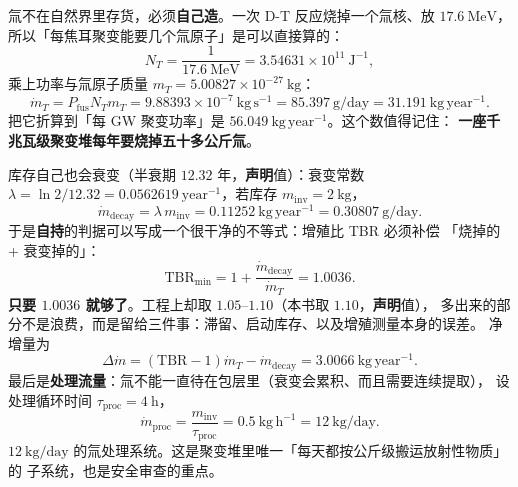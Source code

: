 氚不在自然界里存货，必须\textbf{自己造}。一次 D-T 反应烧掉一个氚核、放
$17.6\ \mathrm{MeV}$，所以「每焦耳聚变能要几个氚原子」是可以直接算的：
\begin{equation}
N_T = \frac{1}{17.6\ \mathrm{MeV}} = 3.54631\times10^{11}\ \mathrm{J^{-1}},
\label{eq:app-z-burnj}
\end{equation}
乘上功率与氚原子质量 $m_T=5.00827\times10^{-27}\ \mathrm{kg}$：
\begin{equation}
\dot m_T = P_{\mathrm{fus}}N_T m_T
= 9.88393\times10^{-7}\ \mathrm{kg\,s^{-1}}
= 85.397\ \mathrm{g/day} = 31.191\ \mathrm{kg\,year^{-1}}.
\label{eq:app-z-burnrate}
\end{equation}
把它折算到「每 GW 聚变功率」是 $56.049\ \mathrm{kg\,year^{-1}}$。这个数值得记住：
\textbf{一座千兆瓦级聚变堆每年要烧掉五十多公斤氚}。

库存自己也会衰变（半衰期 $12.32$ 年，\textbf{声明}值）：衰变常数
$\lambda=\ln 2/12.32 = 0.0562619\ \mathrm{year^{-1}}$，若库存 $m_{\mathrm{inv}}=2\ \mathrm{kg}$，
\begin{equation}
\dot m_{\mathrm{decay}} = \lambda\,m_{\mathrm{inv}}
= 0.11252\ \mathrm{kg\,year^{-1}} = 0.30807\ \mathrm{g/day}.
\label{eq:app-z-decay}
\end{equation}
于是\textbf{自持}的判据可以写成一个很干净的不等式：增殖比 TBR 必须补偿
「烧掉的 + 衰变掉的」：
\begin{equation}
\mathrm{TBR}_{\min} = 1 + \frac{\dot m_{\mathrm{decay}}}{\dot m_T} = 1.0036.
\label{eq:app-z-tbrbreak}
\end{equation}
\textbf{只要 $1.0036$ 就够了}。工程上却取 $1.05$--$1.10$（本书取 $1.10$，\textbf{声明}值），
多出来的部分不是浪费，而是留给三件事：滞留、启动库存、以及增殖测量本身的误差。
净增量为
\begin{equation}
\Delta \dot m = \left(\mathrm{TBR}-1\right)\dot m_T - \dot m_{\mathrm{decay}}
= 3.0066\ \mathrm{kg\,year^{-1}}.
\label{eq:app-z-excess}
\end{equation}
最后是\textbf{处理流量}：氚不能一直待在包层里（衰变会累积、而且需要连续提取），
设处理循环时间 $\tau_{\mathrm{proc}}=4\ \mathrm{h}$，
\begin{equation}
\dot m_{\mathrm{proc}} = \frac{m_{\mathrm{inv}}}{\tau_{\mathrm{proc}}}
= 0.5\ \mathrm{kg\,h^{-1}} = 12\ \mathrm{kg/day}.
\label{eq:app-z-proc}
\end{equation}
$12\ \mathrm{kg/day}$ 的氚处理系统。这是聚变堆里唯一「每天都按公斤级搬运放射性物质」的
子系统，也是安全审查的重点。

